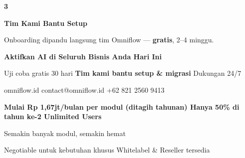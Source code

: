 \documentclass[a4paper]{article}
\begin{document}
\begin{center}
\begin{minipage}[t]{0.318\textwidth}
{\begin{minipage}[t][4.7cm][c]{\dimexpr\linewidth-2\fboxsep\relax}
            \begin{center}{\fontsize{22}{26}\selectfont\bfseries\color{BluePrimary} 3}\end{center}
            \vspace{2pt}
            \begin{center}
                {\fontsize{10}{13}\selectfont\bfseries\color{BlueDark} Tim Kami Bantu Setup}\par\vspace{3pt}
                {\fontsize{9}{12}\selectfont\color{TextDark} Onboarding dipandu langsung tim Omniflow --- \textbf{gratis}, 2--4 minggu.}
            \end{center}
        \end{minipage}}
\end{minipage}
\end{center}

\vspace{8pt}

{\setlength{\fboxsep}{10pt}\setlength{\fboxrule}{0pt}%
\noindent\colorbox{BluePrimary}{%
    \begin{minipage}{\dimexpr\textwidth-2\fboxsep\relax}
        \centering
        {\fontsize{13}{16}\selectfont\bfseries\color{White} Aktifkan AI di Seluruh Bisnis Anda Hari Ini}\par\vspace{3pt}
        {\fontsize{9.5}{12}\selectfont\color{BlueMid} Uji coba gratis 30 hari \enspace\textbullet\enspace \textbf{Tim kami bantu setup \& migrasi} \enspace\textbullet\enspace Dukungan 24/7}\par\vspace{2pt}
        {\fontsize{9.5}{12}\selectfont\color{BlueLight} omniflow.id \enspace\textbullet\enspace contact@omniflow.id \enspace\textbullet\enspace +62 821 2560 9413}
    \end{minipage}}}


\vspace{6pt}

{\setlength{\fboxsep}{8pt}\setlength{\fboxrule}{0pt}%
\noindent\colorbox{BlueBg}{%
    \begin{minipage}{\dimexpr\textwidth-2\fboxsep\relax}
        \centering
        {\fontsize{9}{12}\selectfont\bfseries\color{BluePrimary}
        Mulai Rp 1,67jt/bulan per modul (ditagih tahunan) \enspace\textbullet\enspace Hanya 50\% di tahun ke-2 \enspace\textbullet\enspace Unlimited Users}\par\vspace{1pt}
        {\fontsize{8.5}{11}\selectfont\color{BlueDark}
        Semakin banyak modul, semakin hemat}\par\vspace{1pt}
        {\fontsize{8}{10}\selectfont\color{TextLight}
        Negotiable untuk kebutuhan khusus \enspace\textbullet\enspace Whitelabel \& Reseller tersedia}
    \end{minipage}}}

\restoregeometry
\pagestyle{empty}
\end{document}
